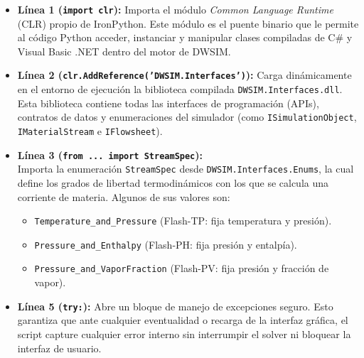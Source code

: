\documentclass[11pt,a4paper]{article}
\begin{document}
\begin{itemize}
    \item \textbf{Línea 1 (\texttt{import clr}):}
    Importa el módulo \textit{Common Language Runtime} (CLR) propio de IronPython. Este módulo es el puente binario que le permite al código Python acceder, instanciar y manipular clases compiladas de C\# y Visual Basic .NET dentro del motor de DWSIM.

    \item \textbf{Línea 2 (\texttt{clr.AddReference('DWSIM.Interfaces')}):}
    Carga dinámicamente en el entorno de ejecución la biblioteca compilada \texttt{DWSIM.Interfaces.dll}. Esta biblioteca contiene todas las interfaces de programación (APIs), contratos de datos y enumeraciones del simulador (como \texttt{ISimulationObject}, \texttt{IMaterialStream} e \texttt{IFlowsheet}).

    \item \textbf{Línea 3 (\texttt{from ... import StreamSpec}):} \\
    Importa la enumeración \texttt{StreamSpec} desde \texttt{DWSIM.Interfaces.Enums}, la cual define los grados de libertad termodinámicos con los que se calcula una corriente de materia. Algunos de sus valores son:
    \begin{itemize}
        \item \texttt{Temperature\_and\_Pressure} (Flash-TP: fija temperatura y presión).
        \item \texttt{Pressure\_and\_Enthalpy} (Flash-PH: fija presión y entalpía).
        \item \texttt{Pressure\_and\_VaporFraction} (Flash-PV: fija presión y fracción de vapor).
    \end{itemize}

    \item \textbf{Línea 5 (\texttt{try:}):}
    Abre un bloque de manejo de excepciones seguro. Esto garantiza que ante cualquier eventualidad o recarga de la interfaz gráfica, el script capture cualquier error interno sin interrumpir el solver ni bloquear la interfaz de usuario.


\end{itemize}
\end{document}
